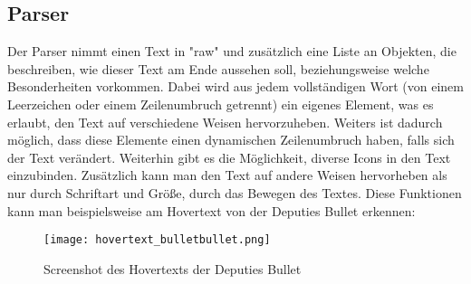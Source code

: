
\renewcommand{\kapitelautor}{Autor: Felix Zwickelstorfer}
\subsection{Parser}\label{subsec:parser}
\renewcommand{\kapitelautor}{Autor: Felix Zwickelstorfer}

Der Parser nimmt einen Text in "raw" und zusätzlich eine Liste an Objekten, die beschreiben, wie dieser Text am Ende aussehen soll, beziehungsweise welche Besonderheiten vorkommen.
Dabei wird aus jedem vollständigen Wort (von einem Leerzeichen oder einem Zeilenumbruch getrennt) ein eigenes Element, was es erlaubt, den Text auf verschiedene Weisen hervorzuheben.
Weiters ist dadurch möglich, dass diese Elemente einen dynamischen Zeilenumbruch haben, falls sich der Text verändert.
Weiterhin gibt es die Möglichkeit, diverse Icons in den Text einzubinden.
Zusätzlich kann man den Text auf andere Weisen hervorheben als nur durch Schriftart und Größe, \zB durch das Bewegen des Textes.
Diese Funktionen kann man beispielsweise am Hovertext von der Deputies Bullet erkennen:
\begin{figure}[H]
    \centering
    \texttt{[image: hovertext\_bulletbullet.png]}
    \caption{Screenshot des Hovertexts der Deputies Bullet}
\end{figure}